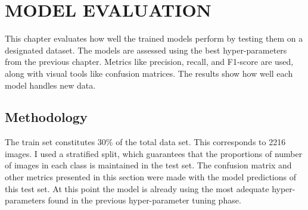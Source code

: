 \chapter{MODEL EVALUATION}
\label{ch:evaluation}
This chapter evaluates how well the trained models perform by testing them on a designated dataset. The models are assessed using the best hyper-parameters from the previous chapter. Metrics like precision, recall, and F1-score are used, along with visual tools like confusion matrices. The results show how well each model handles new data.

\section{Methodology}
The train set constitutes 30\% of the total data set. This corresponds to 2216 images. I used a stratified split, which guarantees that the proportions of number of images in each class is maintained in the test set. The confusion matrix and other metrics presented in this section were made with the model predictions of this test set. At this point the model is already using the most adequate hyper-parameters found in the previous hyper-parameter tuning phase. 

